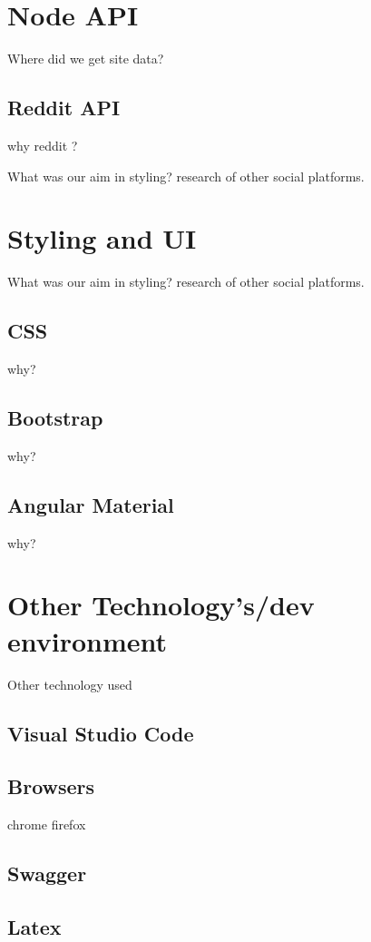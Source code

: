 \section{Node API}
Where did we get site data?

\subsection{Reddit API}
why reddit ?

What was our aim in styling? research of other social platforms.

\section{Styling and UI}
What was our aim in styling? research of other social platforms.

\subsection{CSS}
why?
\subsection{Bootstrap}
why?
\subsection{Angular Material}
why?

\section{Other Technology's/dev environment}
Other technology used
\subsection{Visual Studio Code}
\subsection{Browsers}
chrome firefox
\subsection{Swagger}
\subsection{Latex}



